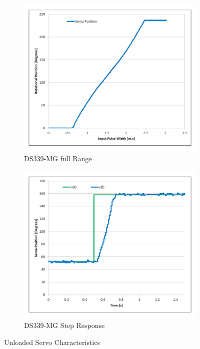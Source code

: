 \begin{figure}[htbp]
\centering
\begin{subfigure}{0.49\textwidth}
\centering
\includegraphics[width=\textwidth]{graphs/servo-range}
\caption{DS339-MG full Range}
\label{fig:servo-range}
\end{subfigure}
\begin{subfigure}{0.49\textwidth}
\centering
\includegraphics[width=\textwidth]{graphs/servo-step}
\caption{DS339-MG Step Response}
\label{fig:servo-step}
\end{subfigure}
\caption{Unloaded Servo Characteristics}
\label{fig:servo-no-load}
\end{figure}
